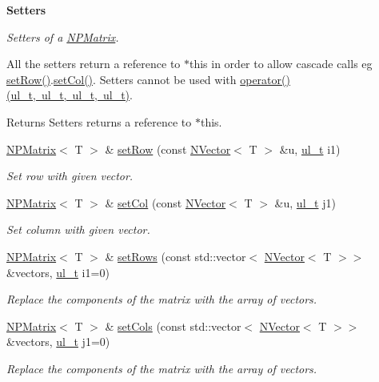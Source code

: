 \begin{Indent}\textbf{ Setters}\par
{\em Setters of a {\ttfamily \mbox{\hyperlink{class_n_p_matrix}{N\+P\+Matrix}}}.

All the setters return a reference to {\ttfamily $\ast$this} in order to allow cascade calls eg {\ttfamily \mbox{\hyperlink{class_n_p_matrix_aac65ad5cc7a3a73b8eddbd8501957ca6}{set\+Row()}}.\mbox{\hyperlink{class_n_p_matrix_ac950c160738743255b84702fca1e521d}{set\+Col()}}}. Setters cannot be used with {\ttfamily \mbox{\hyperlink{class_n_p_matrix_a5f7e5d337efe283e3f88716bd2205d55}{operator()(ul\+\_\+t, ul\+\_\+t, ul\+\_\+t, ul\+\_\+t)}}}. \begin{DoxyReturn}{Returns}
Setters returns a reference to {\ttfamily $\ast$this}. 
\end{DoxyReturn}
}\begin{DoxyCompactItemize}
\item 
\mbox{\hyperlink{class_n_p_matrix}{N\+P\+Matrix}}$<$ T $>$ \& \mbox{\hyperlink{class_n_p_matrix_aac65ad5cc7a3a73b8eddbd8501957ca6}{set\+Row}} (const \mbox{\hyperlink{class_n_vector}{N\+Vector}}$<$ T $>$ \&u, \mbox{\hyperlink{typedef_8h_a1b140a2034db3f5dfe18a987745df43a}{ul\+\_\+t}} i1)
\begin{DoxyCompactList}\small\item\em Set row with given vector. \end{DoxyCompactList}\item 
\mbox{\hyperlink{class_n_p_matrix}{N\+P\+Matrix}}$<$ T $>$ \& \mbox{\hyperlink{class_n_p_matrix_ac950c160738743255b84702fca1e521d}{set\+Col}} (const \mbox{\hyperlink{class_n_vector}{N\+Vector}}$<$ T $>$ \&u, \mbox{\hyperlink{typedef_8h_a1b140a2034db3f5dfe18a987745df43a}{ul\+\_\+t}} j1)
\begin{DoxyCompactList}\small\item\em Set column with given vector. \end{DoxyCompactList}\item 
\mbox{\hyperlink{class_n_p_matrix}{N\+P\+Matrix}}$<$ T $>$ \& \mbox{\hyperlink{class_n_p_matrix_af3dc4092df58ba94efe38e0c1c4591b7}{set\+Rows}} (const std\+::vector$<$ \mbox{\hyperlink{class_n_vector}{N\+Vector}}$<$ T $>$$>$ \&vectors, \mbox{\hyperlink{typedef_8h_a1b140a2034db3f5dfe18a987745df43a}{ul\+\_\+t}} i1=0)
\begin{DoxyCompactList}\small\item\em Replace the components of the matrix with the array of vectors. \end{DoxyCompactList}\item 
\mbox{\hyperlink{class_n_p_matrix}{N\+P\+Matrix}}$<$ T $>$ \& \mbox{\hyperlink{class_n_p_matrix_a3e3f383b3092d70144e1178da15c5376}{set\+Cols}} (const std\+::vector$<$ \mbox{\hyperlink{class_n_vector}{N\+Vector}}$<$ T $>$$>$ \&vectors, \mbox{\hyperlink{typedef_8h_a1b140a2034db3f5dfe18a987745df43a}{ul\+\_\+t}} j1=0)
\begin{DoxyCompactList}\small\item\em Replace the components of the matrix with the array of vectors. \end{DoxyCompactList}\end{DoxyCompactItemize}
\end{Indent}
